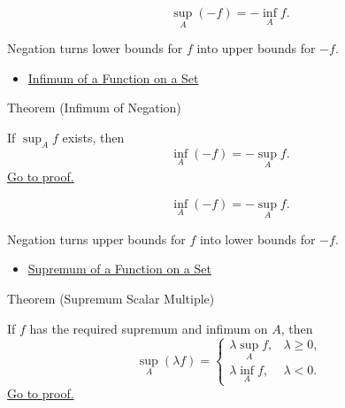 \begin{remark*}
\[
  \sup_A(-f)=-\inf_A f.
\]
\end{remark*}

\begin{remark*}[Interpretation]
Negation turns lower bounds for \(f\) into upper bounds for \(-f\).
\end{remark*}

\begin{dependencies}
\begin{itemize}
  \item \hyperref[def:function-infimum-on-set]{Infimum of a Function on a Set}
\end{itemize}
\end{dependencies}

\begin{theorembox}{Theorem (Infimum of Negation)}
\begin{theorem}
\label{thm:infimum-negation}
If \(\sup_A f\) exists, then
\[
  \inf_A(-f)=-\sup_A f.
\]
\hyperref[prf:infimum-negation]{Go to proof.}
\end{theorem}
\end{theorembox}

\begin{remark*}
\[
  \inf_A(-f)=-\sup_A f.
\]
\end{remark*}

\begin{remark*}[Interpretation]
Negation turns upper bounds for \(f\) into lower bounds for \(-f\).
\end{remark*}

\begin{dependencies}
\begin{itemize}
  \item \hyperref[def:function-supremum-on-set]{Supremum of a Function on a Set}
\end{itemize}
\end{dependencies}

\begin{theorembox}{Theorem (Supremum Scalar Multiple)}
\begin{theorem}
\label{thm:supremum-scalar-multiple}
If \(f\) has the required supremum and infimum on \(A\), then
\[
  \sup_A(\lambda f)=
  \begin{cases}
    \lambda\sup_A f,& \lambda\geq0,\\
    \lambda\inf_A f,& \lambda<0.
  \end{cases}
\]
\hyperref[prf:supremum-scalar-multiple]{Go to proof.}
\end{theorem}
\end{theorembox}

